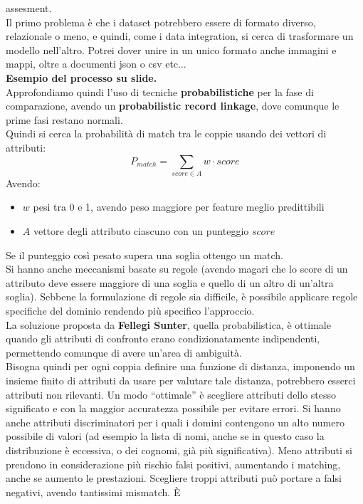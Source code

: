 \documentclass[a4paper,12pt, oneside]{book}
\begin{document}
assesment.\\ 
Il primo problema è che i dataset potrebbero essere di formato diverso,
relazionale o meno, e quindi, come i data integration, si cerca di trasformare
un modello nell'altro. Potrei dover unire in un unico formato anche immagini e
mappi, oltre a documenti json o csv etc$\ldots$ \\
\textbf{Esempio del processo su slide.}\\
Approfondiamo quindi l'uso di tecniche \textbf{probabilistiche} per la fase di
comparazione, avendo un \textbf{probabilistic record linkage}, dove comunque le
prime fasi restano normali.\\
Quindi si cerca la probabilità di match tra le coppie usando dei vettori di
attributi:
\[P_{match}=\sum_{score\in A}w\cdot score\]
Avendo:
\begin{itemize}
  \item $w$ pesi tra 0 e 1, avendo peso maggiore per feature meglio predittibili
  \item $A$ vettore degli attributo ciascuno con un punteggio $score$
\end{itemize}
Se il punteggio così pesato supera una soglia ottengo un match.\\
Si hanno anche meccanismi basate su regole (avendo magari che lo score di un
attributo deve essere maggiore di una soglia e quello di un altro di un'altra
soglia). Sebbene la formulazione di regole sia difficile, è possibile applicare
regole specifiche del dominio rendendo più specifico l'approccio.\\
La soluzione proposta da \textbf{Fellegi Sunter}, quella probabilistica, è
ottimale quando gli attributi di confronto erano condizionatamente
indipendenti, permettendo comunque di avere un'area di ambiguità.\\
Bisogna quindi per ogni coppia definire una funzione di distanza, imponendo un
insieme finito di attributi da usare per valutare tale distanza, potrebbero
esserci attributi non rilevanti. Un modo ``ottimale'' è scegliere attributi
dello stesso significato e con la maggior accuratezza possibile per evitare
errori. Si hanno anche attributi discriminatori per i quali i domini contengono
un alto numero possibile di valori (ad esempio la lista di nomi, anche
se in questo caso la distribuzione è eccessiva, o dei cognomi, già più
significativa). Meno attributi si prendono in considerazione più rischio falsi
positivi, aumentando i matching, anche se aumento le prestazioni. Scegliere
troppi attributi può portare a falsi negativi, avendo tantissimi mismatch. È
\end{document}
